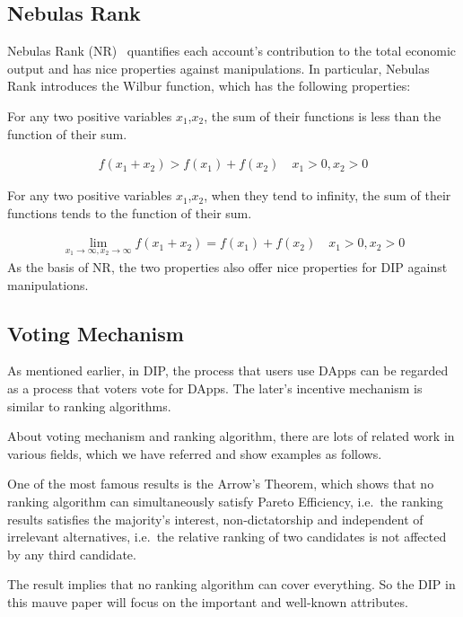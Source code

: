 \subsection{Nebulas Rank}
Nebulas Rank (NR)~\cite{Nebulasyellowpaper} quantifies each account's contribution to the total economic output and has nice properties against manipulations. In particular, Nebulas Rank introduces the Wilbur function, which has the following properties:

\begin{property}
	\label{prop:one}
	For any two positive variables $x_1$,$x_2$, the sum of their functions is less than the function of their sum.
\end{property}
\begin{align}
	f(x_1+x_2)>f(x_1)+f(x_2) \quad x_1>0,x_2>0
\end{align}
\begin{property}
	\label{prop:two}
	For any two positive variables $x_1$,$x_2$, when they tend to infinity, the sum of their functions tends to the function of their sum.
\end{property}

\begin{align}
	\lim\limits_{x_1 \to \infty, x_2\to \infty} f(x_1+x_2) = f(x_1) + f(x_2)\quad x_1>0, x_2>0
\end{align}
\noindent As the basis of NR, the two properties also offer nice properties for DIP against manipulations.

\subsection{Voting Mechanism}
As mentioned earlier, in DIP, the process that users use DApps can be regarded as a process that voters vote for DApps. The later's incentive mechanism is similar to ranking algorithms.

About voting mechanism and ranking algorithm, there are lots of related work in various fields, which we have referred and show examples as follows.

One of the most famous results is the Arrow's Theorem, which shows that no
ranking algorithm can simultaneously satisfy Pareto Efficiency, i.e.\, the
ranking results satisfies the majority's interest, non-dictatorship and
independent of irrelevant alternatives, i.e.\ the relative ranking of two candidates is not affected by any third candidate.

The result implies that no ranking algorithm can cover everything. So the DIP
in this mauve paper will focus on the important and well-known attributes.

